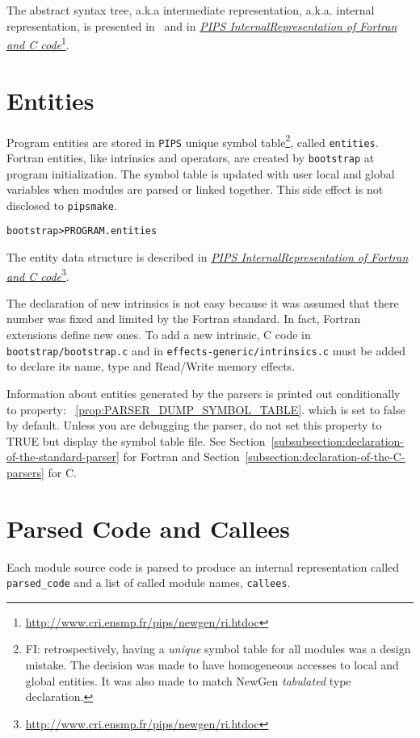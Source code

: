 \documentclass[a4paper]{report}
\newenvironment{PipsMake}{\begin{alltt}}{\end{alltt}}
\newcommand{\PipsPropRef}[1]{\texttt{\detokenize{#1}}~\ref{prop:#1}}
\newcommand{\LINK}[2]{\href{#2}{#1}\footnote{\url{#2}}\xspace}
\newcommand{\Pips}{\texttt{PIPS}}
\newcommand{\Pipsmake}{\texttt{pipsmake}}
\newcommand{\Pri}{\LINK{\emph{PIPS Internal\space{}Representation of
      Fortran and C code}}{http://www.cri.ensmp.fr/pips/newgen/ri.htdoc}}
\begin{document}
The abstract syntax tree, a.k.a intermediate representation,
a.k.a. internal representation, is presented in~\cite{IJT92} and in \Pri{}.

\section{Entities}
\label{subsubsection-entities}

Program entities are stored in \Pips{} unique symbol table\footnote{FI:
retrospectively, having a {\em unique} symbol table for all modules was
a design mistake. The decision was made to have homogeneous accesses to
local and global entities. It was also made to match NewGen {\em
tabulated} type declaration.}, called \verb+entities+. Fortran entities,
like intrinsics and operators, are created by \verb+bootstrap+ at
program initialization. The symbol table is updated with user local and
global variables when modules are parsed or linked together. This side
effect is not disclosed to \Pipsmake{}.

\begin{PipsMake}
bootstrap                       > PROGRAM.entities
\end{PipsMake}

The entity data structure is described in \Pri{}.

The declaration of new intrinsics is not easy because it was assumed that
there number was fixed and limited by the Fortran standard. In fact,
Fortran extensions define new ones. To add a new intrinsic, C code in
\texttt{bootstrap/bootstrap.c} and in \texttt{effects-generic/intrinsics.c}
must be added to declare its name, type and Read/Write memory effects.

Information about entities generated by the parsers is printed out
conditionally to property: \PipsPropRef{PARSER_DUMP_SYMBOL_TABLE}.
which is set to false by default. Unless you are debugging the parser,
do not set this property to TRUE but display the symbol table file. See Section~\ref{subsubsection:declaration-of-the-standard-parser}
for Fortran and Section~\ref{subsection:declaration-of-the-C-parsers}
for C.

\section{Parsed Code and Callees}
\label{subsection-parsed-code-and-callees}

Each module source code is parsed to produce an internal representation
called \verb+parsed_code+ and a list of called module names,
\verb+callees+.
\end{document}
